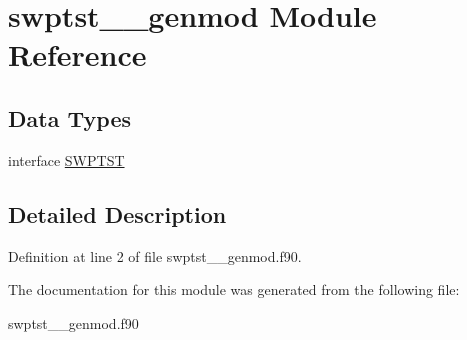 \hypertarget{classswptst____genmod}{\section{swptst\+\_\+\+\_\+genmod Module Reference}
\label{classswptst____genmod}
}
\subsection*{Data Types}
\begin{DoxyCompactItemize}
\item 
interface \hyperlink{interfaceswptst____genmod_1_1_s_w_p_t_s_t}{S\+W\+P\+T\+S\+T}
\end{DoxyCompactItemize}


\subsection{Detailed Description}


Definition at line 2 of file swptst\+\_\+\+\_\+genmod.\+f90.



The documentation for this module was generated from the following file\+:\begin{DoxyCompactItemize}
\item 
swptst\+\_\+\+\_\+genmod.\+f90\end{DoxyCompactItemize}
